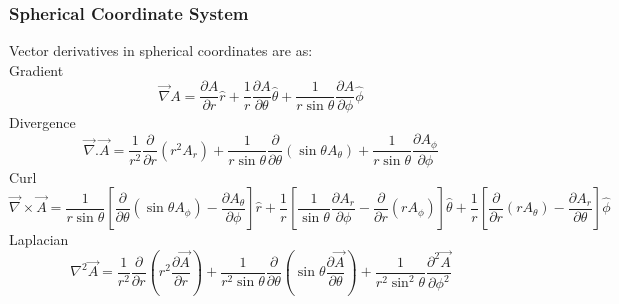 \subsubsection{Spherical Coordinate System}
Vector derivatives in spherical coordinates are as:\\
Gradient\\
\begin{equation}
\vec{\nabla} A = \frac{\partial A}{\partial r}\hat{r}+\frac{1}{r}\frac{\partial A}{\partial \theta}\hat{\theta}+\frac{1}{r\sin\theta}\frac{\partial A}{\partial \phi}\hat{\phi}
\end{equation}
Divergence\\
\begin{equation}
\vec{\nabla}.\vec{A} = \frac{1}{r^2}\frac{\partial}{\partial r}(r^2A_r)+\frac{1}{r\sin\theta}\frac{\partial}{\partial\theta}(\sin\theta A_\theta)+\frac{1}{r\sin\theta}\frac{\partial A_\phi}{\partial\phi}
\end{equation}
Curl\\
\begin{equation}
\vec{\nabla}\times\vec{A} = \frac{1}{r\sin\theta}[\frac{\partial}{\partial\theta}(\sin\theta A_\phi)-\frac{\partial A_\theta}{\partial\phi}]\hat{r}+\frac{1}{r}[\frac{1}{\sin\theta}\frac{\partial A_r}{\partial\phi}-\frac{\partial}{\partial r}(rA_\phi)]\hat{\theta}+\frac{1}{r}[\frac{\partial}{\partial r}(rA_\theta)-\frac{\partial A_r}{\partial \theta}]\hat{\phi}
\end{equation}
Laplacian\\
\begin{equation}
\nabla^2 \vec{A} = \frac{1}{r^2}\frac{\partial}{\partial r}(r^2\frac{\partial\vec{A}}{\partial r})+\frac{1}{r^2\sin\theta}\frac{\partial}{\partial\theta}(\sin\theta\frac{\partial\vec{A}}{\partial \theta})+\frac{1}{r^2\sin^2\theta}\frac{\partial^2\vec{A}}{\partial \phi^2}
\end{equation}

